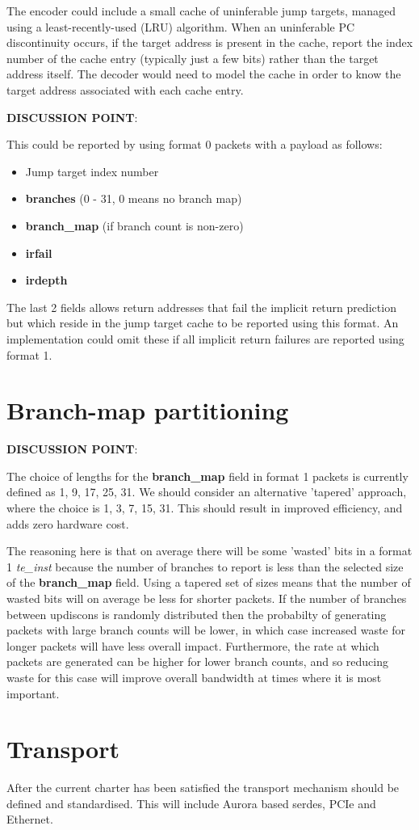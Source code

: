 The encoder could include a small cache of uninferable jump targets, managed using a
least-recently-used (LRU) algorithm.  When an uninferable PC discontinuity occurs, if 
the target address is present in the cache, report the index number of the cache
entry (typically just a few bits) rather than the target address itself.  The decoder 
would need to model the cache in order to know the target address associated with
each cache entry.

\textbf{DISCUSSION POINT}:

This could be reported by using format 0 packets with a payload as follows:

\begin{itemize}
  \item Jump target index number
  \item \textbf{branches} (0 - 31, 0 means no branch map)
  \item \textbf{branch\_map} (if branch count is non-zero)
  \item \textbf{irfail} 
  \item \textbf{irdepth}
\end{itemize}

The last 2 fields allows return addresses that fail the implicit return prediction but 
which reside in the jump target cache to be reported using this format.  An implementation
could omit these if all implicit return failures are reported using format 1.

\section{Branch-map partitioning}

\textbf{DISCUSSION POINT}:

The choice of lengths for the \textbf{branch\_map} field in format 1 packets is currently defined as
1, 9, 17, 25, 31.  We should consider an alternative 'tapered' approach, where the choice is 1, 3, 7, 15, 31.
This should result in improved efficiency, and adds zero hardware cost.

The reasoning here is that on average there will be some 'wasted' bits in a format 1 \textit{te\_inst}
because the number of branches to report is less than the selected size of the \textbf{branch\_map} field.
Using a tapered set of sizes means that the number of wasted bits will on average be less for shorter packets.
If the number of branches between updiscons is randomly distributed then the probabilty of generating packets with large
branch counts will be lower, in which case increased waste for longer packets will have less overall impact.
Furthermore, the rate at which packets are generated can be higher for lower branch counts, and so reducing
waste for this case will improve overall bandwidth at times where it is most important.

\section{Transport}

After the current charter has been satisfied the transport mechanism
should be defined and standardised. This will include Aurora based
serdes, PCIe and Ethernet.

